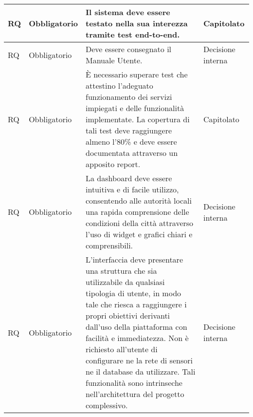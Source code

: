 \begin{longtable}{|C{1.5cm}|C{2cm}|L{5cm}|C{2cm}|}
    \hline
     RQ & Obbligatorio & Il sistema deve essere testato nella sua interezza tramite test end-to-end. & Capitolato \\

    \hline
     RQ & Obbligatorio & Deve essere consegnato il Manuale Utente. & Decisione interna \\

    \hline
     RQ & Obbligatorio & È necessario superare test che attestino l'adeguato funzionamento dei servizi impiegati e delle funzionalità implementate. La copertura di tali test deve raggiungere almeno l'80\% e deve essere documentata attraverso un apposito report. & Capitolato \\

    \hline
     RQ & Obbligatorio & La dashboard deve essere intuitiva e di facile utilizzo, consentendo alle autorità locali una rapida comprensione delle condizioni della città attraverso l'uso di widget e grafici chiari e comprensibili. & Decisione interna \\

    \hline
     RQ & Obbligatorio & L’interfaccia deve presentare una struttura che sia utilizzabile da qualsiasi tipologia di utente, in modo tale che riesca a raggiungere i propri obiettivi derivanti dall’uso della piattaforma con facilità e immediatezza. Non è richiesto all’utente di configurare ne la rete di sensori ne il database da utilizzare. Tali funzionalità sono intrinseche nell’architettura del progetto complessivo. & Decisione interna \\

    \hline
   
\end{longtable}
